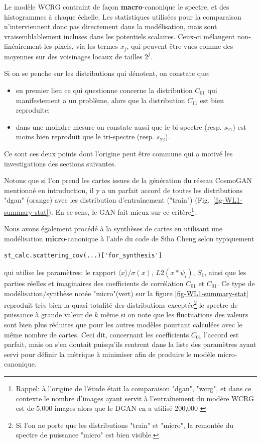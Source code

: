 \documentclass[12pt,twoside]{article}
\newcommand{\itemb}{\item[$\bullet$]}
\begin{document}
Le modèle WCRG contraint de façon \textbf{macro}-canonique le spectre, et des histogrammes à chaque échelle. Les statistiques utilisées pour la comparaison n'interviennent donc pas directement dans la modélisation, mais sont vraisemblablement incluses dans les potentiels scalaires. Ceux-ci mélangent non-linéairement les pixels, via les termes $x_j$, qui peuvent être vues comme des moyennes sur des voisinages locaux de tailles $2^j$.

Si on se penche sur les distributions qui dénotent, on constate que:
\begin{itemize}
\itemb en premier lieu ce qui questionne concerne la distribution $C_{01}$ qui manifestement a un problème, alors que la distribution $C_{11}$ est bien reproduite;
\itemb dans une moindre mesure on constate aussi que le bi-spectre (resp. $s_{21}$) est moins bien reproduit que le tri-spectre (resp. $s_{22}$).
\end{itemize} 
Ce sont ces deux points dont l'origine peut être commune qui a motivé les investigations des sections suivantes. 

Notons que si l'on prend les cartes  issues de la génération du réseau CosmoGAN mentionné en introduction, il y a un parfait accord de toutes les distributions "dgan" (orange) avec les distribution d'entraînement ("train") (Fig.~\ref{fig-WL1-summary-stat}). En ce sens, le GAN fait mieux sur ce critère\footnote{Rappel: à l'origine de l'étude était la comparaison "dgan", "wcrg", et dans ce contexte le nombre d'images ayant servit à l'entraînement du modère WCRG est de 5,000 images alors que le DGAN en a utilisé 200,000 \citep{2019ComAC...6....1M}}.  

Nous avons également procédé à la synthèses de cartes en utilisant une modélisation \textbf{micro}-canonique \citep{2023arXiv230617210C} à l'aide du code de Siho Cheng selon typiquement 
\begin{lstlisting}[language=iPython]
 st_calc.scattering_cov(...)['for_synthesis']
\end{lstlisting}
qui utilise les paramètres: le rapport $\langle x\rangle/\sigma(x)$, $L2(x\ast \psi_i)$, $S_1$, ainsi que les parties réelles et imaginaires des coefficients de corrélation $C_{01}$ et $C_{01}$.  Ce type de modélisation/synthèse notée "micro"(vert) sur la figure \ref{fig-WL1-summary-stat} reproduit très bien la quasi totalité des distributions exceptée\footnote{Si l'on ne porte que les distributions "train" et "micro", la remontée du spectre de puissance "micro" est bien visible.} le spectre de puissance à grande valeur de $k$ même si on note que les fluctuations des valeurs sont bien plus réduites que pour les autres modèles pourtant calculées avec le même nombre de cartes. Ceci dit, concernant les coefficients $C_{01}$ l'accord est parfait, mais on s'en doutait puisqu'ils rentrent dans la liste des paramètres ayant servi pour définir la métrique à minimiser afin de produire le modèle micro-canonique.
\end{document}
